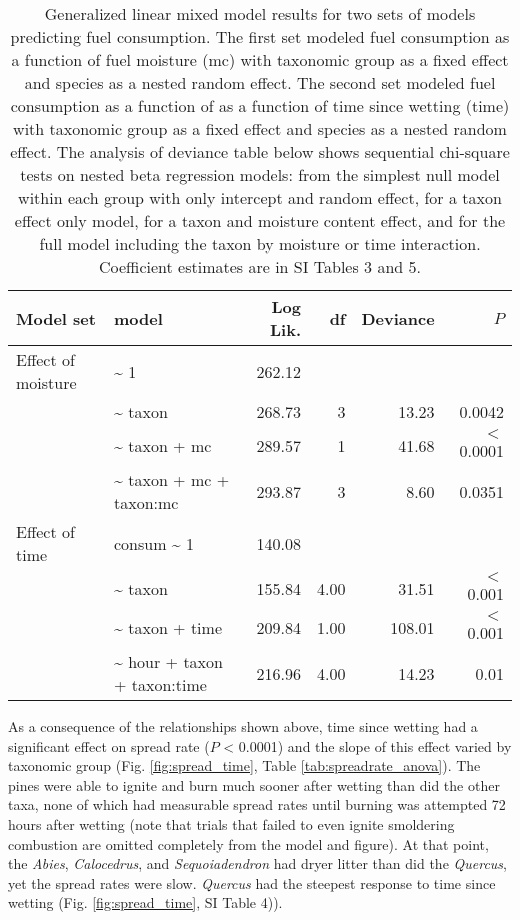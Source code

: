 \documentclass[letterpaper,12pt]{article}
\begin{document}
\begin{table}[h]
  \caption{Generalized linear mixed model results for two sets of models
    predicting fuel consumption. The first set modeled fuel consumption as a
    function of fuel moisture (mc) with taxonomic group as a fixed effect and
    species as a nested random effect. The second set modeled fuel consumption
    as a function of as a function of time since wetting (time) with taxonomic
    group as a fixed effect and species as a nested random effect. The analysis
    of deviance table below shows sequential chi-square tests on nested beta
    regression models: from the simplest null model within each group with only
    intercept and random effect, for a taxon effect only model, for a taxon and
    moisture content effect, and for the full model including the taxon by
    moisture or time interaction. Coefficient estimates are in SI Tables 3 and
    5.}
  \label{tab:consume_anova}
  \centering

  \begin{tabular}{llrrrr}
\toprule
Model set & model & Log Lik. & df & Deviance & $P$ \\ 
\midrule
  Effect of moisture &   \~{} 1 & 262.12 &  &  &  \\ 
   &  \~{} taxon & 268.73 & 3 & 13.23 & 0.0042 \\ 
   & \~{} taxon + mc & 289.57 & 1 & 41.68 & $<$ 0.0001 \\ 
   & \~{} taxon + mc + taxon:mc & 293.87 & 3 & 8.60 & 0.0351 \\ 
\midrule
Effect of time &  consum \~{} 1 & 140.08 &  &  &  \\ 
 & \~{} taxon & 155.84 & 4.00 & 31.51 & $<$ 0.001 \\ 
 & \~{} taxon + time & 209.84 & 1.00 & 108.01 & $<$ 0.001 \\ 
 & \~{} hour + taxon + taxon:time & 216.96 & 4.00 & 14.23 & 0.01 \\ 
    \bottomrule
    \end{tabular}
\end{table}


As a consequence of the relationships shown above, time since wetting had a
significant effect on spread rate ($P$ < 0.0001) and the slope of this effect
varied by taxonomic group (Fig. \ref{fig:spread_time}, Table
\ref{tab:spreadrate_anova}). The pines were able to ignite and burn much sooner
after wetting than did the other taxa, none of which had measurable spread
rates until burning was attempted 72 hours after wetting (note that trials that
failed to even ignite smoldering combustion are omitted completely from the
model and figure). At that point, the \emph{Abies}, \emph{Calocedrus}, and
\emph{Sequoiadendron} had dryer litter than did the \emph{Quercus}, yet the
spread rates were slow. \emph{Quercus} had the steepest response to time since
wetting (Fig. \ref{fig:spread_time}, SI Table 4)).
\end{document}
